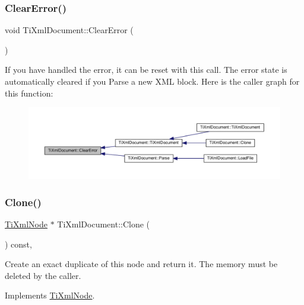 \subsubsection{\texorpdfstring{Clear\+Error()}{ClearError()}}
{\footnotesize\ttfamily void Ti\+Xml\+Document\+::\+Clear\+Error (\begin{DoxyParamCaption}{ }\end{DoxyParamCaption})\hspace{0.3cm}{\ttfamily [inline]}}

If you have handled the error, it can be reset with this call. The error state is automatically cleared if you Parse a new X\+ML block. Here is the caller graph for this function\+:
\nopagebreak
\begin{figure}[H]
\begin{center}
\leavevmode
\includegraphics[width=350pt]{class_ti_xml_document_ac66b8c28db86363315712a3574e87c35_icgraph}
\end{center}
\end{figure}
\mbox{\label{class_ti_xml_document_a46a4dda6c56eb106d46d4046ae1e5353}} 
\subsubsection{\texorpdfstring{Clone()}{Clone()}}
{\footnotesize\ttfamily \hyperlink{class_ti_xml_node}{Ti\+Xml\+Node} $\ast$ Ti\+Xml\+Document\+::\+Clone (\begin{DoxyParamCaption}{ }\end{DoxyParamCaption}) const\hspace{0.3cm}{\ttfamily [protected]}, {\ttfamily [virtual]}}

Create an exact duplicate of this node and return it. The memory must be deleted by the caller. 

Implements \hyperlink{class_ti_xml_node_a4508cc3a2d7a98e96a54cc09c37a78a4}{Ti\+Xml\+Node}.

